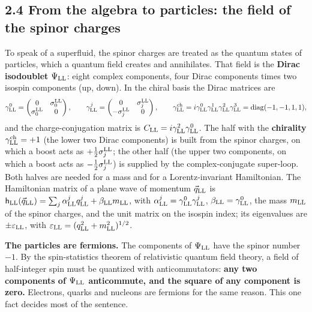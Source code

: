 \documentclass[
  10pt,
]{article}
\begin{document}
\hypertarget{from-the-algebra-to-particles-the-field-of-the-spinor-charges}{%
\subsection{2.4 From the algebra to particles: the field of the spinor
charges}\label{from-the-algebra-to-particles-the-field-of-the-spinor-charges}}

To speak of a superfluid, the spinor charges are treated as the quantum
states of particles, which a quantum field creates and annihilates. That
field is the \textbf{Dirac isodoublet} \(\Psi_{\rm LL}\): eight complex
components, four Dirac components times two isospin components (up,
down). In the chiral basis the Dirac matrices are
\[\gamma^0_{\rm LL}=\begin{pmatrix}0&\sigma^{\rm LL}_0\\\sigma^{\rm LL}_0&0\end{pmatrix},\qquad\gamma^j_{\rm LL}=\begin{pmatrix}0&\sigma^{\rm LL}_j\\-\sigma^{\rm LL}_j&0\end{pmatrix},\qquad\gamma^{\rm ch}_{\rm LL}=i\gamma^0_{\rm LL}\gamma^1_{\rm LL}\gamma^2_{\rm LL}\gamma^3_{\rm LL}=\mathrm{diag}(-1,-1,1,1),\]
and the charge-conjugation matrix is
\(C_{\rm LL}=i\gamma^2_{\rm LL}\gamma^0_{\rm LL}\). The half with the
\textbf{chirality} \(\gamma^{\rm ch}_{\rm LL}=+1\) (the lower two Dirac
components) is built from the spinor charges, on which a boost acts as
\(+\tfrac12\sigma^{\rm LL}_j\); the other half (the upper two
components, on which a boost acts as \(-\tfrac12\sigma^{\rm LL}_j\)) is
supplied by the complex-conjugate super-loop. Both halves are needed for
a mass and for a Lorentz-invariant Hamiltonian. The Hamiltonian matrix
of a plane wave of momentum \(\vec q_{\rm LL}\) is
\(\mathsf h_{\rm LL}(\vec q_{\rm LL})=\sum_j\alpha^j_{\rm LL}q^j_{\rm LL}+\beta_{\rm LL}m_{\rm LL}\),
with \(\alpha^j_{\rm LL}=\gamma^0_{\rm LL}\gamma^j_{\rm LL}\),
\(\beta_{\rm LL}=\gamma^0_{\rm LL}\), the mass \(m_{\rm LL}\) of the
spinor charges, and the unit matrix on the isospin index; its
eigenvalues are \(\pm\varepsilon_{\rm LL}\), with
\(\varepsilon_{\rm LL}=(q_{\rm LL}^2+m_{\rm LL}^2)^{1/2}\).

\textbf{The particles are fermions.} The components of \(\Psi_{\rm LL}\)
have the spinor number \(-1\). By the spin-statistics theorem of
relativistic quantum field theory, a field of half-integer spin must be
quantized with anticommutators: \textbf{any two components of
\(\Psi_{\rm LL}\) anticommute, and the square of any component is zero.}
Electrons, quarks and nucleons are fermions for the same reason. This
one fact decides most of the sentence.
\end{document}
